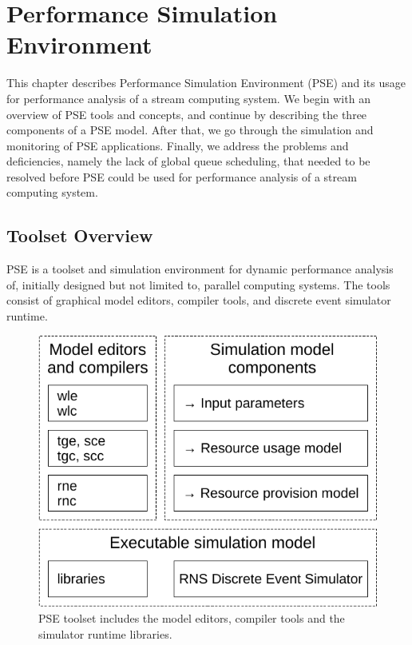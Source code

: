 \chapter{Performance Simulation Environment}
\label{chapter:performance-simulation-environment}

This chapter describes Performance Simulation Environment (PSE) and its usage for performance analysis of a stream computing system. We begin with an overview of PSE tools and concepts, and continue by describing the three components of a PSE model. After that, we go through the simulation and monitoring of PSE applications. Finally, we address the problems and deficiencies, namely the lack of global queue scheduling, that needed to be resolved before PSE could be used for performance analysis of a stream computing system.

\section{Toolset Overview}
\label{sec:toolset-overview}

PSE is a toolset and simulation environment for dynamic performance analysis of, initially designed but not limited to, parallel computing systems. The tools consist of graphical model editors, compiler tools, and discrete event simulator runtime.

\begin{figure}[]
  \begin{center}
    \includegraphics[width=\textwidth/2]{images/pse-toolset-overview.pdf}
    \caption{PSE toolset includes the model editors, compiler tools and the simulator runtime libraries.}
    \label{fig:pse-toolset}
  \end{center}
\end{figure}

